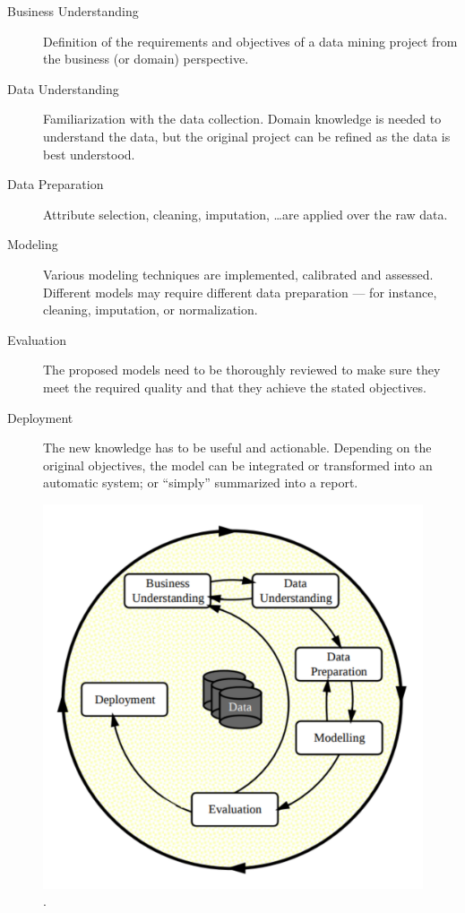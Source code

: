 \begin{description}
    \item[Business Understanding] Definition of the requirements and objectives of a data mining project
        from the business (or domain) perspective.
    \item[Data Understanding] Familiarization with the data collection. Domain knowledge
        is needed to understand the data, but the original project can be refined as the data is best understood.
    \item[Data Preparation] Attribute selection, cleaning, imputation, \ldots are applied over the raw data.
    \item[Modeling] Various modeling techniques are implemented, calibrated and assessed. Different models may require different data preparation ---
    for instance, cleaning, imputation, or normalization.
    \item[Evaluation] The proposed models need to be thoroughly reviewed to make sure they meet the required quality and that they achieve the stated
    objectives.
    \item[Deployment] The new knowledge has to be useful and actionable.
    Depending on the original objectives, the model can be integrated 
    or transformed into an automatic system; or ``simply'' summarized into a report.
\end{description}

\begin{figure}[htb]
    \centering
    \includegraphics[width=0.8\linewidth]{images/1_introduction/crisp-dm.pdf}
    \caption{.}
    \label{fig:crispdm}
\end{figure}

